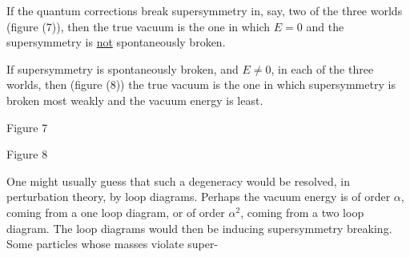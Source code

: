 If the quantum corrections break supersymmetry in, say, two of
the three worlds (figure (7)), then the true vacuum is the one in which
$E = 0$ and the supersymmetry is \underline{not}
spontaneously broken.

If supersymmetry is spontaneously broken, and $E \neq 0$, in each
of the three worlds, then (figure (8)) the true vacuum is the one in
which supersymmetry is broken most weakly and the vacuum energy is
least.

\begin{center}
\begin{minipage}{0.42\textwidth}
\centering
{}
\par\smallskip
Figure 7
\end{minipage}\hfill
\begin{minipage}{0.42\textwidth}
\centering
{}
\par\smallskip
Figure 8
\end{minipage}
\end{center}

One might usually guess that such a degeneracy would be resolved,
in perturbation theory, by loop diagrams. Perhaps the vacuum energy
is of order $\alpha$, coming from a one loop diagram, or of order $\alpha^2$, coming
from a two loop diagram. The loop diagrams would then be inducing
supersymmetry breaking. Some particles whose masses violate super-


